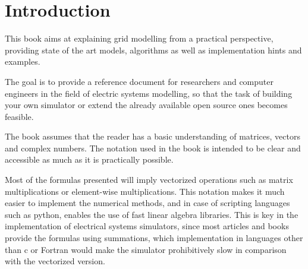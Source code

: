 \documentclass[nols,a4paper,twoside,notoc,fleqn]{tufte-book}
\newcommand{\monthyear}{%
  \ifcase\month\or January\or February\or March\or April\or May\or June\or
  July\or August\or September\or October\or November\or
  December\fi\space\number\year
}
\begin{document}
\newpage
%
%
%
%



\tableofcontents

\listoffigures

\listoftables


\mainmatter
\chapter{Introduction}

This book aims at explaining grid modelling from a practical perspective, providing state of the art models, algorithms as well as implementation hints and examples.

The goal is to provide a reference document for researchers and computer engineers in the field of electric systems modelling, so that the task of building your own simulator or extend the already available open source ones becomes feasible.

The book assumes that the reader has a basic understanding of matrices, vectors and complex numbers. The notation used in the book is intended to be clear and accessible as much as it is practically possible.

Most of the formulas presented will imply vectorized operations such as matrix multiplications or element-wise multiplications. This notation makes it much easier to implement the numerical methods, and in case of scripting languages such as python, enables the use of fast linear algebra libraries. This is key in the implementation of electrical systems simulators, since most articles and books provide the formulas using summations, which implementation in languages other than c or Fortran would make the simulator prohibitively slow in comparison with the vectorized version.
\end{document}
